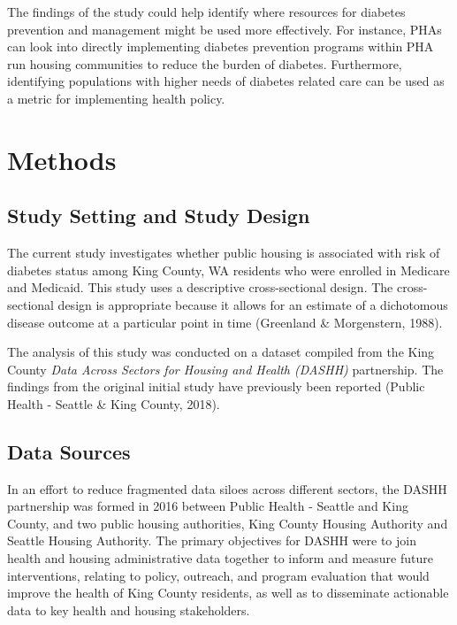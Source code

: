 \documentclass [11pt, proquest] {uwthesis}[2015/03/03]
\begin{document}
The findings of the study could help identify where resources for
diabetes prevention and management might be used more effectively. For
instance, PHAs can look into directly implementing diabetes prevention
programs within PHA run housing communities to reduce the burden of
diabetes. Furthermore, identifying populations with higher needs of
diabetes related care can be used as a metric for implementing health
policy.

\chapter{Methods}\label{methods}

\section{Study Setting and Study
Design}\label{study-setting-and-study-design}

The current study investigates whether public housing is associated with
risk of diabetes status among King County, WA residents who were
enrolled in Medicare and Medicaid. This study uses a descriptive
cross-sectional design. The cross-sectional design is appropriate
because it allows for an estimate of a dichotomous disease outcome at a
particular point in time (Greenland \& Morgenstern, 1988).

The analysis of this study was conducted on a dataset compiled from the
King County \emph{Data Across Sectors for Housing and Health (DASHH)}
partnership. The findings from the original initial study have
previously been reported (Public Health - Seattle \& King County, 2018).

\section{Data Sources}\label{data-sources}

In an effort to reduce fragmented data siloes across different sectors,
the DASHH partnership was formed in 2016 between Public Health - Seattle
and King County, and two public housing authorities, King County Housing
Authority and Seattle Housing Authority. The primary objectives for
DASHH were to join health and housing administrative data together to
inform and measure future interventions, relating to policy, outreach,
and program evaluation that would improve the health of King County
residents, as well as to disseminate actionable data to key health and
housing stakeholders.
\end{document}
